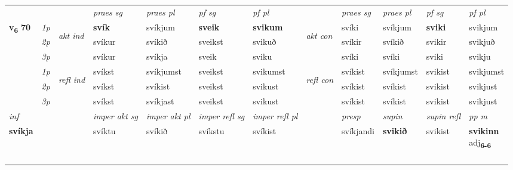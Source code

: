\begin{longtable}[l]{X>{\footnotesize\itshape}llXXXXlXXXX}
\midrule

 & &   & \textit{praes sg}  & \textit{praes pl}    & \textit{ pf sg} & \textit{pf pl} & & \textit{praes sg}  & \textit{praes pl}    & \textit{pf sg} & \textit{pf pl }  \\ \cmidrule{4-7} \cmidrule{9-12}
 \multirow{2}{*}{{{\textbf{v{\textsubscript{6}}} \Large{\textbf{70}}}}}  & 1p & \multirow{3}{*}{\begin{turn}{90}\textit{akt ind}\end{turn}} & \textbf{svík} & svíkjum & \textbf{sveik} & \textbf{svikum} & \multirow{3}{*}{\begin{turn}{90}\textit{akt con}\end{turn}} &svíki & svíkjum & \textbf{sviki} & svikjum\\*
 & 2p &  &  svíkur  & svíkið & sveikst & svikuð & & svíkir & svíkið & svikir & svikjuð \\*
 & 3p &  & svíkur & svíkja & sveik & sviku & & svíki & svíki& sviki & svikju \\*
\cmidrule{4-7} \cmidrule{9-12}
 & 1p & \multirow{3}{*}{\begin{turn}{90}\textit{refl ind}\end{turn}}  & svíkst & svíkjumst & sveikst & svikumst & \multirow{3}{*}{\begin{turn}{90}\textit{refl con}\end{turn}}  &svíkist & svíkjumst & svikist & svikjumst \\*
 & 2p &  & svíkst & svíkist & sveikst & svikust & &svíkist & svíkist & svikist & svikjust \\*
 & 3p  & & svíkst & svíkjast & sveikst & svikust & & svíkist & svíkist& svikist & svikjust \\*
\cmidrule{4-7} \cmidrule{9-12}

   {\textit{inf}} & &  & \textit{imper akt sg} & \textit{imper akt pl} & \textit{imper refl sg} & \textit{imper refl pl} && \textit{presp} & \textit{supin} & \textit{supin refl} & \textit{pp m} \\*
  {\textbf{svíkja}} & && svíktu  & svíkið & svíkstu & svíkist && svíkjandi &  \textbf{svikið} & svikist & \specialcell{\textbf{svikinn} \\ adj\textbf{\textsubscript{6-6}}} \\*

\midrule
& \\*
 & \\*
   & \\*
  & \\
  

\end{longtable}
